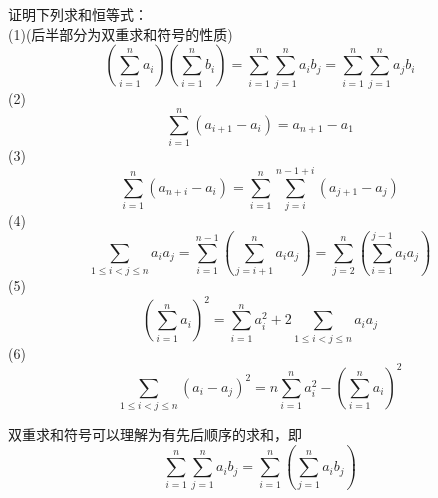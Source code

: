 \documentclass[lang=cn, zihao=5]{elegantbook}
\newcommand{\ssb}[1]{\left( #1 \right)}
\begin{document}
\begin{example}
	证明下列求和恒等式：\\
	(1)(后半部分为双重求和符号的性质)$$\ssb{\sum_{i=1}^{n}a_i} \ssb{\sum_{i=1}^{n}b_i} = \sum_{i=1}^{n}\sum_{j=1}^{n} a_ib_j = \sum_{i=1}^{n}\sum_{j=1}^{n} a_jb_i$$
	(2)$$\sum_{i=1}^{n}(a_{i+1}-a_i)=a_{n+1}-a_1$$
	(3)$$\sum_{i=1}^{n} (a_{n+i}-a_i) = \sum_{i=1}^n \sum_{j=i}^{n-1+i}(a_{j+1}-a_j)$$
	(4)$$\sum_{1 \leq i < j \leq n}a_ia_j = \sum_{i=1}^{n-1} \ssb{\sum_{j=i+1}^{n} a_ia_j} = \sum_{j=2}^{n} \ssb{\sum_{i=1}^{j-1} a_ia_j}$$
	(5)$$\ssb{\sum_{i=1}^n a_i}^2 = \sum_{i=1}^{n} a_i^2 + 2\sum_{1 \leq i < j \leq n}a_ia_j$$
	(6)$$\sum_{1 \leq i < j \leq n}(a_i-a_j)^2 = n\sum_{i=1}^{n} a_i^2 - \ssb{\sum_{i=1}^{n} a_i}^2$$
\end{example}
\begin{remark}
	双重求和符号可以理解为有先后顺序的求和，即$$\sum_{i=1}^{n}\sum_{j=1}^{n} a_ib_j = \sum_{i=1}^{n} \ssb{\sum_{j=1}^{n} a_ib_j}$$
\end{remark}
\end{document}
